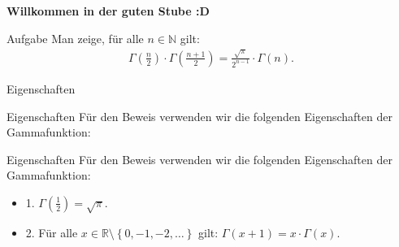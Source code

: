 \documentclass[10pt]{beamer}
\title{}
\author{Artur's \( \oint \) Mathematikstübchen}
\date{}
\def\bN{\mathbb{N}}
\def\bR{\mathbb{R}}
\begin{document}

\begin{frame}
    \begin{center}
        \textbf{\huge Willkommen in der guten Stube \newline \newline :D}
    \end{center}
\end{frame}




\begin{frame}
    \begin{alertblock}{Aufgabe}
        Man zeige, für alle \( n \in \bN \) gilt:
        \begin{align*}
            \Gamma\left( \frac{n}{2} \right) \cdot \Gamma\left( \frac{n + 1}{2} \right) 
            = \frac{\sqrt{\pi}}{2^{n - 1}} \cdot \Gamma\left( n \right).
        \end{align*}
    \end{alertblock}
\end{frame}



\begin{frame}{Eigenschaften}
    
\end{frame}



\begin{frame}{Eigenschaften}
    Für den Beweis verwenden wir die folgenden Eigenschaften der Gammafunktion:
\end{frame}



\begin{frame}{Eigenschaften}
    Für den Beweis verwenden wir die folgenden Eigenschaften der Gammafunktion:
    \begin{itemize}
        \item<1-> 1. \( \Gamma\left( \frac{1}{2} \right) = \sqrt{\pi} \).
        \item<2->  2. Für alle \( x \in \bR \setminus \left\{ 0, -1, -2, \ldots \right\} \) gilt: \( \Gamma\left( x + 1 \right) = x \cdot \Gamma\left( x \right) \).
    \end{itemize}
\end{frame}
\end{document}
